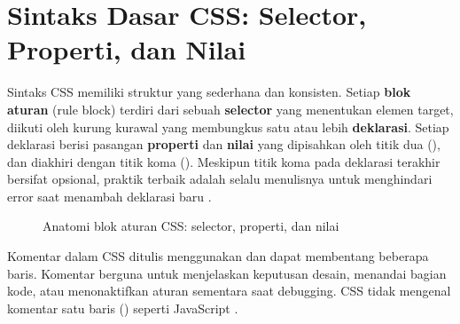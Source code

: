 ﻿\section{Sintaks Dasar CSS: Selector, Properti, dan Nilai}

Sintaks CSS memiliki struktur yang sederhana dan konsisten. Setiap \textbf{blok aturan} (rule block) terdiri dari sebuah \textbf{selector} yang menentukan elemen target, diikuti oleh kurung kurawal \code{\{\}} yang membungkus satu atau lebih \textbf{deklarasi}. Setiap deklarasi berisi pasangan \textbf{properti} dan \textbf{nilai} yang dipisahkan oleh titik dua (\code{:}), dan diakhiri dengan titik koma (\code{;}). Meskipun titik koma pada deklarasi terakhir bersifat opsional, praktik terbaik adalah selalu menulisnya untuk menghindari error saat menambah deklarasi baru \cite{mdnCss}.

\begin{figure}[H]
\centering
{}
\caption{Anatomi blok aturan CSS: selector, properti, dan nilai}
\end{figure}

Komentar dalam CSS ditulis menggunakan  dan dapat membentang beberapa baris. Komentar berguna untuk menjelaskan keputusan desain, menandai bagian kode, atau menonaktifkan aturan sementara saat debugging. CSS tidak mengenal komentar satu baris (\code{//}) seperti JavaScript \cite{webdevCss}.

